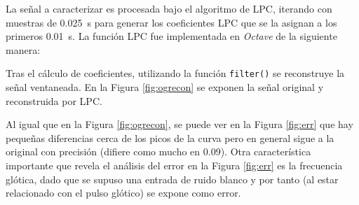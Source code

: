 
	La señal a caracterizar es procesada bajo el algoritmo de LPC, iterando con muestras de \SI{0.025}{\s} para generar los coeficientes LPC que se la asignan a los primeros \SI{.01}{\s}. La función LPC fue implementada en \emph{Octave} de la siguiente manera:
	

	Tras el cálculo de coeficientes, utilizando la función \texttt{filter()} se reconstruye la señal ventaneada. En la Figura \ref{fig:ogrecon} se exponen la señal original y reconstruida por LPC.


 Al igual que en la Figura \ref{fig:ogrecon}, se puede ver en la Figura \ref{fig:err} que hay pequeñas diferencias cerca de los picos de la curva pero en general sigue a la original con precisión (difiere como mucho en \num{0.09}). Otra característica importante que revela el análisis del error en la Figura \ref{fig:err} es la frecuencia glótica, dado que se supuso una entrada de ruido blanco y por tanto (al estar relacionado con el pulso glótico) se expone como error.
%	
